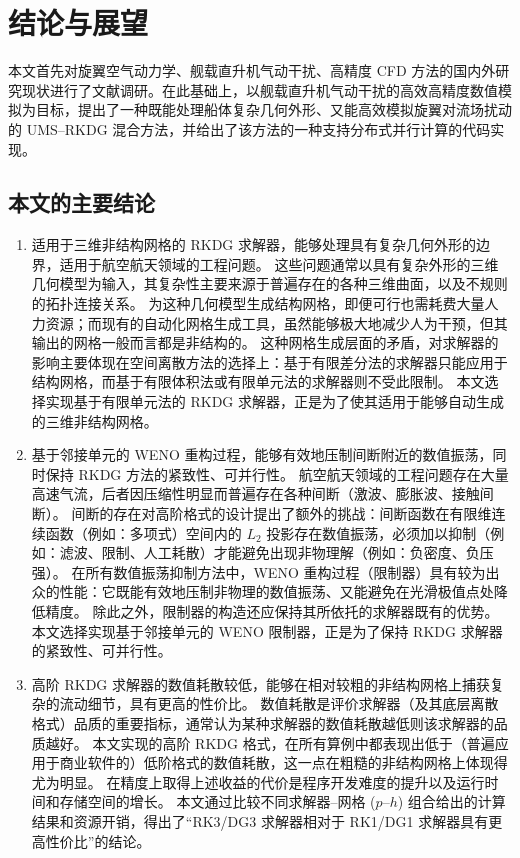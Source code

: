 
\chapter*{结论与展望}


本文首先对旋翼空气动力学、舰载直升机气动干扰、高精度 CFD 方法的国内外研究现状进行了文献调研。在此基础上，以舰载直升机气动干扰的高效高精度数值模拟为目标，提出了一种既能处理船体复杂几何外形、又能高效模拟旋翼对流场扰动的
UMS–RKDG 混合方法，并给出了该方法的一种支持分布式并行计算的代码实现。

\section*{本文的主要结论}
\begin{enumerate}[wide]
\item 适用于三维非结构网格的 RKDG 求解器，能够处理具有复杂几何外形的边界，适用于航空航天领域的工程问题。
这些问题通常以具有复杂外形的三维几何模型为输入，其复杂性主要来源于普遍存在的各种三维曲面，以及不规则的拓扑连接关系。
为这种几何模型生成结构网格，即便可行也需耗费大量人力资源；而现有的自动化网格生成工具，虽然能够极大地减少人为干预，但其输出的网格一般而言都是非结构的。
这种网格生成层面的矛盾，对求解器的影响主要体现在空间离散方法的选择上：基于有限差分法的求解器只能应用于结构网格，而基于有限体积法或有限单元法的求解器则不受此限制。
本文选择实现基于有限单元法的 RKDG 求解器，正是为了使其适用于能够自动生成的三维非结构网格。

\item 基于邻接单元的 WENO 重构过程，能够有效地压制间断附近的数值振荡，同时保持 RKDG 方法的紧致性、可并行性。
航空航天领域的工程问题存在大量高速气流，后者因压缩性明显而普遍存在各种间断（激波、膨胀波、接触间断）。
间断的存在对高阶格式的设计提出了额外的挑战：间断函数在有限维连续函数（例如：多项式）空间内的 $L_2$ 投影存在数值振荡，必须加以抑制（例如：滤波、限制、人工耗散）才能避免出现非物理解（例如：负密度、负压强）。
在所有数值振荡抑制方法中，WENO 重构过程（限制器）具有较为出众的性能：它既能有效地压制非物理的数值振荡、又能避免在光滑极值点处降低精度。
除此之外，限制器的构造还应保持其所依托的求解器既有的优势。本文选择实现基于邻接单元的 WENO 限制器，正是为了保持 RKDG 求解器的紧致性、可并行性。

\item 高阶 RKDG 求解器的数值耗散较低，能够在相对较粗的非结构网格上捕获复杂的流动细节，具有更高的性价比。
数值耗散是评价求解器（及其底层离散格式）品质的重要指标，通常认为某种求解器的数值耗散越低则该求解器的品质越好。
本文实现的高阶 RKDG 格式，在所有算例中都表现出低于（普遍应用于商业软件的）低阶格式的数值耗散，这一点在粗糙的非结构网格上体现得尤为明显。
在精度上取得上述收益的代价是程序开发难度的提升以及运行时间和存储空间的增长。
本文通过比较不同求解器--网格 ($p$--$h$) 组合给出的计算结果和资源开销，得出了“RK3/DG3 求解器相对于 RK1/DG1 求解器具有更高性价比”的结论。

\end{enumerate}



